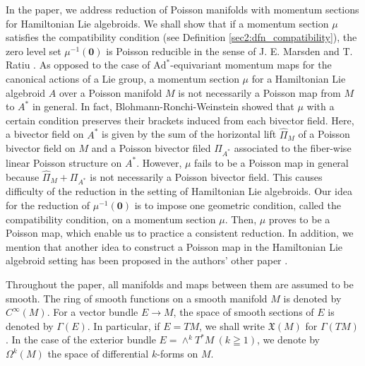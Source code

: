 \documentclass[a4paper,11pt,dvipdfmx]{article}
\numberwithin{equation}{section}
\begin{document}
In the paper, we address reduction of Poisson manifolds with momentum sections for Hamiltonian Lie algebroids. 
We shall show that if a momentum section $\mu$ satisfies the compatibility condition (see Definition \ref{sec2:dfn_compatibility}), the zero level set 
$\mu^{-1}(\boldsymbol{0})$ is Poisson reducible in the sense of J. E. Marsden and T. Ratiu \cite{MRred86}. 
As opposed to the case of $\mathrm{Ad}^*$-equivariant momentum maps for the canonical actions of a Lie group, 
a momentum section $\mu$ for a Hamiltonian Lie algebroid $A$ over a Poisson manifold $M$ is not necessarily a Poisson map from $M$ to $A^*$ in general. 
In fact, Blohmann-Ronchi-Weinstein \cite{BRWham23} showed that $\mu$ with a certain condition preserves their brackets induced from each bivector field. 
Here, a bivector field on $A^*$ is given by the sum of the horizontal lift $\hat{\Pi}_M$ of a Poisson bivector field on $M$ 
and a Poisson bivector filed $\Pi_{A^*}$ associated to the fiber-wise linear Poisson structure on $A^*$. 
However, $\mu$ fails to be a Poisson map in general because $\hat{\Pi}_M + \Pi_{A^*}$ is not necessarily a Poisson bivector field. 
This causes difficulty of the reduction in the setting of Hamiltonian Lie algebroids. 
Our idea for the reduction of $\mu^{-1}(\boldsymbol{0})$ is to impose one geometric condition, called the compatibility condition, on a momentum section $\mu$. 
Then, $\mu$ proves to be a Poisson map, which enable us to practice a consistent reduction. 
In addition, we mention that another idea to construct a Poisson map in the Hamiltonian Lie algebroid setting has been proposed in the authors' other paper \cite{HIcom24}. 
\bigskip 

Throughout the paper, all manifolds and maps between them are assumed to be smooth. The ring of smooth functions on a smooth manifold $M$ is denoted by $C^{\infty}(M)$. 
For a vector bundle $E\to M$, the space of smooth sections of $E$ is denoted by $\varGamma(E)$. In particular, if $E=TM$, we shall write $\mathfrak{X}(M)$ for $\varGamma(TM)$. 
In the case of the exterior bundle $E=\wedge^kT^*M~(k\geqq 1)$, we denote by $\Omega^k(M)$ the space of differential $k$-forms on $M$. 
\end{document}
